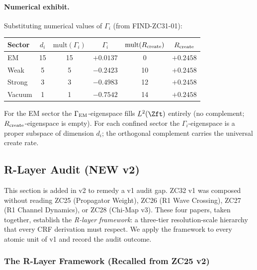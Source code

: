 \documentclass[12pt, a4paper]{article}
\begin{document}
\paragraph{Numerical exhibit.} Substituting numerical
values of $\Gamma_i$ (from FIND-ZC31-01):

\begin{center}
{\small
\setlength{\LTpre}{2pt}
\setlength{\LTpost}{2pt}
\renewcommand{\arraystretch}{1.30}
\begin{tabular}{lccccc}
\toprule
Sector & $d_i$ & $\mathrm{mult}(\Gamma_i)$
  & $\Gamma_i$ & $\mathrm{mult}(R_{\rm create})$
  & $R_{\rm create}$ \\
\midrule
EM     & 15 & 15 & $+0.0137$ & 0  & $+0.2458$\\
Weak   &  5 &  5 & $-0.2423$ & 10 & $+0.2458$\\
Strong &  3 &  3 & $-0.4983$ & 12 & $+0.2458$\\
Vacuum &  1 &  1 & $-0.7542$ & 14 & $+0.2458$\\
\bottomrule
\end{tabular}
}
\end{center}
\medskip

For the EM sector the $\Gamma_{\rm EM}$-eigenspace fills
$L^2(\Zft)$ entirely (no complement; $R_{\rm create}$-eigenspace
is empty). For each confined sector the $\Gamma_i$-eigenspace
is a proper subspace of dimension $d_i$; the orthogonal
complement carries the universal create rate.

\subsection{R-Layer Audit (NEW v2)}
\label{sec:r-layer-audit}

This section is added in v2 to remedy a v1 audit gap.
ZC32 v1 was composed without reading ZC25 (Propagator Weight),
ZC26 (R1 Wave Crossing), ZC27 (R1 Channel Dynamics), or ZC28
(Chi-Map v3). These four papers, taken together, establish the
\emph{R-layer framework}: a three-tier resolution-scale hierarchy
that every CRF derivation must respect. We apply the framework
to every atomic unit of v1 and record the audit outcome.

\subsubsection{The R-Layer Framework (Recalled from ZC25 v2)}
\end{document}
